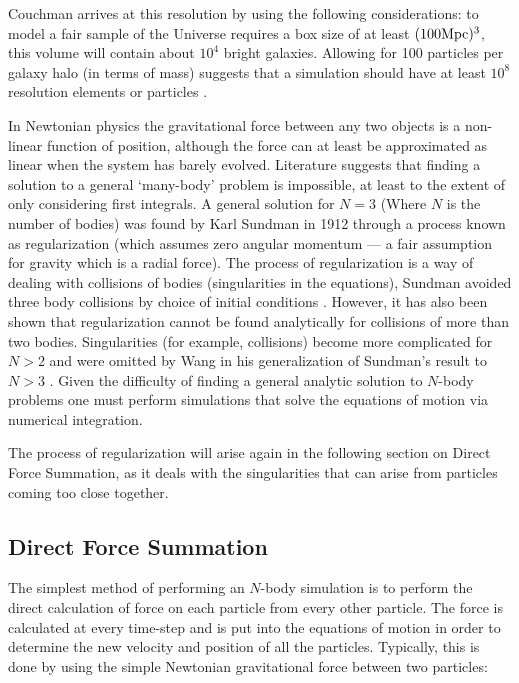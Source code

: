Couchman arrives at this resolution by using the following considerations: to model a fair sample of the Universe requires a box size of at least $(100 {\rm Mpc})^3$, this volume will contain about $10^4$ bright galaxies. Allowing for 100 particles per galaxy halo (in terms of mass) suggests that a simulation should have at least $10^8$ resolution elements or particles \citep{bib_hmpc3}.

In Newtonian physics the gravitational force between any two objects is a non-linear function of position, although the force can at least be approximated as linear when the system has barely evolved. Literature suggests that finding a solution to a general `many-body' problem is impossible, at least to the extent of only considering first integrals. A general solution for $N=3$ (Where $N$ is the number of bodies) was found by Karl Sundman in 1912 through a process known as regularization (which assumes zero angular momentum --- a fair assumption for gravity which is a radial force). The process of regularization is a way of dealing with collisions of bodies (singularities in the equations), Sundman avoided three body collisions by choice of initial conditions \citep{bib_sund}. However, it has also been shown that regularization cannot be found analytically for collisions of more than two bodies. Singularities (for example, collisions) become more complicated for $N>2$ and were omitted by Wang in his generalization of Sundman's result to $N>3$ \citep{bib_wang}. Given the difficulty of finding a general analytic solution to $N$-body problems one must perform simulations that solve the equations of motion via numerical integration.

The process of regularization will arise again in the following section on Direct Force Summation, as it deals with the singularities that can arise from particles coming too close together.

\subsection{Direct Force Summation}
\label{sec.direct}
The simplest method of performing an $N$-body simulation is to perform the direct calculation of force on each particle from every other particle. The force is calculated at every time-step and is put into the equations of motion in order to determine the new velocity and position of all the particles. Typically, this is done by using the simple Newtonian gravitational force between two particles:

